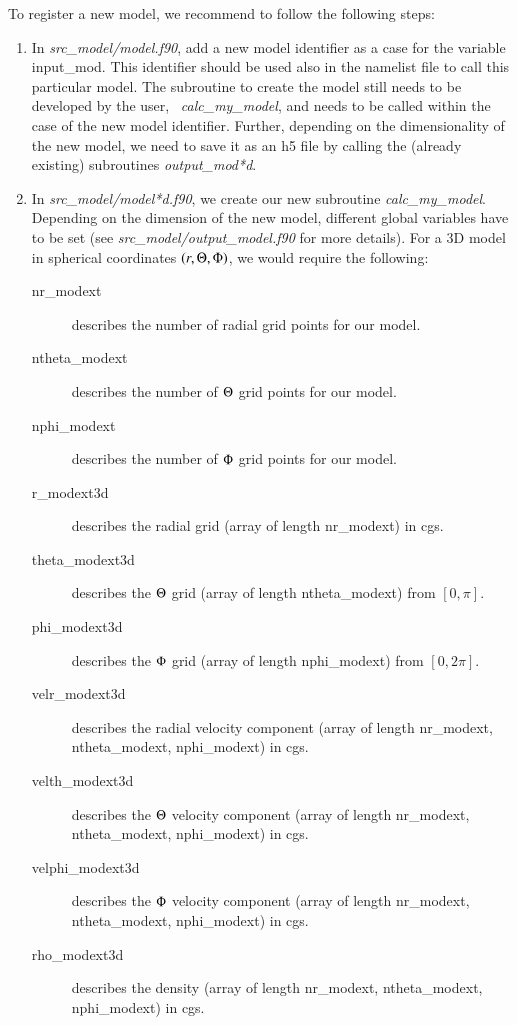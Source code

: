 \documentclass[10pt,a4paper]{article}
\begin{document}
To register a new model, we recommend to follow the following steps:
\begin{enumerate}
\item In \textit{src\_model/model.f90}, add a new model identifier as
  a case for the variable input\_mod. This identifier should be used
  also in the namelist file to call this particular model.
  The subroutine to create the model still needs to be developed by
  the user, \eg~\textit{calc\_my\_model}, and needs to be called within the case
  of the new model identifier. Further, depending on the
  dimensionality of the new model, we need to save it as an h5 file by
  calling the (already existing) subroutines \textit{output\_mod*d}.
  
\item In \textit{src\_model/model*d.f90}, we create our new subroutine
  \textit{calc\_my\_model}. Depending on the dimension of the new
  model, different global variables have to be set (see
  \textit{src\_model/output\_model.f90} for more details). For a 3D
  model in spherical coordinates $(r,\Theta,\Phi)$, we would require the following:
  \begin{description}
  \item[nr\_modext] describes the number of radial grid points for our model.
  \item[ntheta\_modext] describes the number of $\Theta$ grid points for our model.
  \item[nphi\_modext] describes the number of $\Phi$ grid points for our model.
  \item[r\_modext3d] describes the radial grid (array of length nr\_modext) in cgs.
  \item[theta\_modext3d] describes the $\Theta$ grid (array of length ntheta\_modext) from $[0,\pi]$.
  \item[phi\_modext3d] describes the $\Phi$ grid (array of length nphi\_modext) from $[0,2\pi]$.
  \item[velr\_modext3d] describes the radial velocity component (array of length nr\_modext, ntheta\_modext, nphi\_modext) in cgs.
  \item[velth\_modext3d] describes the $\Theta$ velocity component (array of length nr\_modext, ntheta\_modext, nphi\_modext) in cgs.
  \item[velphi\_modext3d] describes the $\Phi$ velocity component (array of length nr\_modext, ntheta\_modext, nphi\_modext) in cgs.
  \item[rho\_modext3d] describes the density (array of length nr\_modext, ntheta\_modext, nphi\_modext) in cgs.

\end{description}
\end{enumerate}
\end{document}
